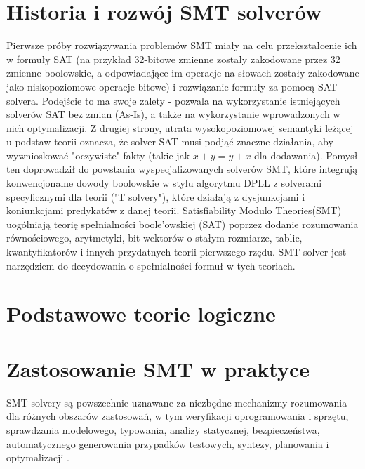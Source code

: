 \section{Historia i rozwój SMT solverów}
Pierwsze próby rozwiązywania problemów SMT miały na celu przekształcenie ich w formuły SAT (na przykład 32-bitowe zmienne zostały zakodowane przez 32 zmienne boolowskie, a odpowiadające im operacje na słowach zostały zakodowane jako niskopoziomowe operacje bitowe) i rozwiązanie formuły za pomocą SAT solvera. Podejście to ma swoje zalety - pozwala na wykorzystanie istniejących solverów SAT bez zmian (As-Is), a także na wykorzystanie wprowadzonych w nich optymalizacji. Z drugiej strony, utrata wysokopoziomowej semantyki leżącej u podstaw teorii oznacza, że solver SAT musi podjąć znaczne działania, aby wywnioskować "oczywiste" fakty (takie jak $x + y = y + x$ dla dodawania). Pomysł ten doprowadził do powstania wyspecjalizowanych solverów SMT, które integrują konwencjonalne dowody boolowskie w stylu algorytmu DPLL z solverami specyficznymi dla teorii ("T solvery"), które działają z dysjunkcjami i koniunkcjami predykatów z danej teorii. 
Satisfiability Modulo Theories(SMT) uogólniają teorię spełnialności boole'owskiej (SAT) poprzez dodanie rozumowania równościowego, arytmetyki, bit-wektorów o stałym rozmiarze, tablic, kwantyfikatorów i innych przydatnych teorii pierwszego rzędu.
SMT solver jest narzędziem do decydowania o spełnialności formuł w tych teoriach. 

\section{Podstawowe teorie logiczne}

\section{Zastosowanie SMT w praktyce}
SMT solvery są powszechnie uznawane za niezbędne mechanizmy rozumowania dla różnych obszarów zastosowań, w tym weryfikacji oprogramowania i sprzętu, sprawdzania modelowego, typowania, analizy statycznej, bezpieczeństwa, automatycznego generowania przypadków testowych, syntezy, planowania i optymalizacji \cite{BarbosaBBKLMMMN22}. 



